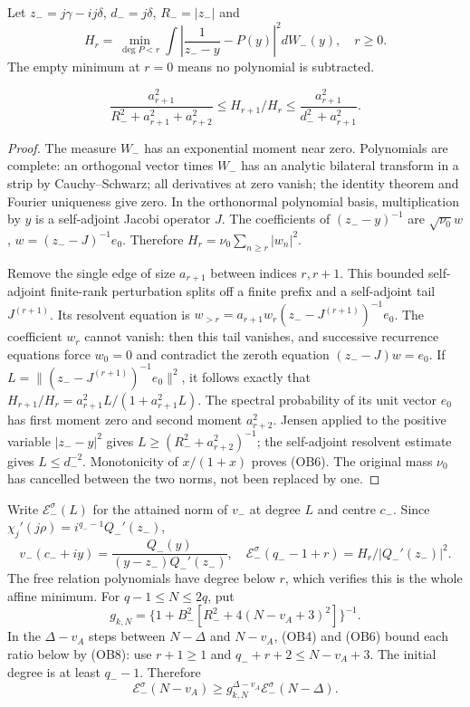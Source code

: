 Let $z_-=j\gamma-ij\delta$, $d_-=j\delta$, $R_-=|z_-|$ and
\[
 H_r=\min_{\deg P<r}\int\left|\frac1{z_--y}-P(y)\right|^2dW_-(y),
 \quad r\ge0.\tag{OB5}
\]
The empty minimum at $r=0$ means no polynomial is subtracted.
\begin{hzoclemma}
\[
 \frac{a_{r+1}^2}{R_-^2+a_{r+1}^2+a_{r+2}^2}
 \le H_{r+1}/H_r\le
 \frac{a_{r+1}^2}{d_-^2+a_{r+1}^2}.\tag{OB6}
\]
\end{hzoclemma}
\begin{proof}
The measure $W_-$ has an exponential moment near zero. Polynomials
are complete: an orthogonal vector times $W_-$ has an analytic
bilateral transform in a strip by Cauchy--Schwarz; all derivatives
at zero vanish; the identity theorem and Fourier uniqueness give zero.
In the orthonormal polynomial basis, multiplication by $y$ is a
self-adjoint Jacobi operator $J$. The coefficients of $(z_--y)^{-1}$
are $\sqrt{\nu_0}w$, $w=(z_--J)^{-1}e_0$. Therefore
$H_r=\nu_0\sum_{n\ge r}|w_n|^2$.

Remove the single edge of size $a_{r+1}$ between indices $r,r+1$.
This bounded self-adjoint finite-rank perturbation splits off a finite
prefix and a self-adjoint tail $J^{(r+1)}$. Its resolvent equation is
$w_{>r}=a_{r+1}w_r(z_--J^{(r+1)})^{-1}e_0$.
The coefficient $w_r$ cannot vanish: then this tail vanishes, and
successive recurrence equations force $w_0=0$ and contradict the
zeroth equation $(z_--J)w=e_0$.
If $L=\|(z_--J^{(r+1)})^{-1}e_0\|^2$, it follows exactly that
$H_{r+1}/H_r=a_{r+1}^2L/(1+a_{r+1}^2L)$.
The spectral probability of its unit vector $e_0$ has first moment
zero and second moment $a_{r+2}^2$. Jensen applied to the positive
variable $|z_--y|^2$ gives $L\ge(R_-^2+a_{r+2}^2)^{-1}$;
the self-adjoint resolvent estimate gives $L\le d_-^{-2}$.
Monotonicity of $x/(1+x)$ proves (OB6). The original mass $\nu_0$
has cancelled between the two norms, not been replaced by one.
\end{proof}

Write $\mathcal E_-^\sigma(L)$ for the attained norm of $v_-$ at
degree $L$ and centre $c_-$. Since
$\chi_j'(j\rho)=i^{q_--1}Q_-'(z_-)$,
\[
 v_-(c_-+iy)=\frac{Q_-(y)}{(y-z_-)Q_-'(z_-)},\quad
 \mathcal E_-^\sigma(q_--1+r)=H_r/|Q_-'(z_-)|^2.\tag{OB7}
\]
The free relation polynomials have degree below $r$, which verifies
this is the whole affine minimum. For $q-1\le N\le2q$, put
\[
 g_{k,N}=\{1+B_-^2[R_-^2+4(N-v_A+3)^2]\}^{-1}.\tag{OB8}
\]
In the $\Delta-v_A$ steps between $N-\Delta$ and $N-v_A$, (OB4)
and (OB6) bound each ratio below by (OB8): use $r+1\ge1$ and
$q_-+r+2\le N-v_A+3$. The initial degree is at least $q_--1$.
Therefore
\[
 \mathcal E_-^\sigma(N-v_A)\ge
 g_{k,N}^{\Delta-v_A}\mathcal E_-^\sigma(N-\Delta).\tag{OB9}
\]

